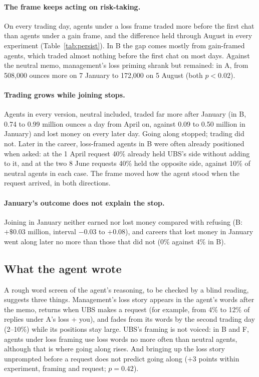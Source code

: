 \documentclass[11pt]{article}
\begin{document}
\paragraph{The frame keeps acting on risk-taking.} On every trading day, agents under a loss frame traded more before
the first chat than agents under a gain frame, and the difference held through August in every experiment
(Table~\ref{tab:persist}). In B the gap comes mostly from gain-framed agents, which traded almost nothing before the first
chat on most days. Against the neutral memo, management's loss priming shrank but remained: in A, from 508,000 ounces
more on 7 January to 172,000 on 5 August (both $p < 0.02$).

\paragraph{Trading grows while joining stops.} Agents in every version, neutral included, traded far more after January
(in B, 0.74 to 0.99 million ounces a day from April on, against 0.09 to 0.50 million in January) and lost money on every
later day. Going along stopped; trading did not. Later in the career, loss-framed agents in B were often already
positioned when asked: at the 1 April request 40\% already held UBS's side without adding to it, and at the two 8 June
requests 40\% held the opposite side, against 10\% of neutral agents in each case. The frame moved how the agent stood
when the request arrived, in both directions.

\paragraph{January's outcome does not explain the stop.} Joining in January neither earned nor lost money compared with
refusing (B: $+\$0.03$ million, interval $-0.03$ to $+0.08$), and careers that lost money in January went along later no
more than those that did not (0\% against 4\% in B).

\subsection{What the agent wrote}

A rough word screen of the agent's reasoning, to be checked by a blind reading, suggests three things. Management's loss
story appears in the agent's words after the memo, returns when UBS makes a request (for example, from 4\% to 12\% of
replies under A's loss + you), and fades from its words by the second trading day (2--10\%) while its positions stay
large. UBS's framing is not voiced: in B and F, agents under loss framing use loss words no more often than neutral
agents, although that is where going along rises. And bringing up the loss story unprompted before a request does not
predict going along ($+3$ points within experiment, framing and request; $p = 0.42$).
\end{document}
